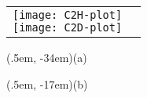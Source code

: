 \documentclass[varwidth=22em]{standalone}
\begin{document}
	\begin{tabular}[c]{p{22em}p{45em}}
		\shortstack[c]{
			\texttt{[image: C2H-plot]} \\
		\texttt{[image: C2D-plot]}}
		& 
		\shortstack[c]{}
	\end{tabular}
	\begin{textblock*}{5em}(.5em, -34em)\sf (a)\end{textblock*}
	\begin{textblock*}{5em}(.5em, -17em)\sf (b)\end{textblock*}
\end{document}
